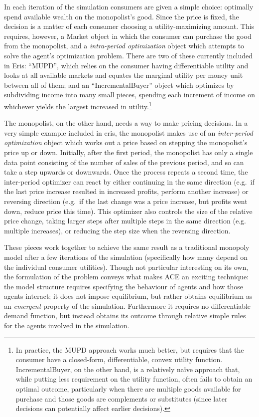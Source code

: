 \documentclass[12pt]{article}
\numberwithin{equation}{subsection}
\begin{document}
In each iteration of the simulation consumers are given a simple choice: optimally spend available
wealth on the monopolist's good.  Since the
price is fixed, the decision is a matter of each consumer choosing a utility-maximizing amount.
This requires, however, a Market object in which the consumer can purchase the good from the
monopolist, and a \emph{intra-period optimization} object which attempts to solve the agent's
optimization problem.  There are two of these currently included in Eris: ``MUPD'', which relies on
the consumer having differentiable utility and looks at all available markets and equates the
marginal utility per money unit between all of them; and an ``IncrementalBuyer'' object which
optimizes by subdividing income into many small pieces, spending each increment of income on
whichever yields the largest increased in utility.\footnote{In practice, the MUPD approach works
    much better, but requires that the consumer have a closed-form, differentiable, convex utility
    function.  IncrementalBuyer, on the other hand, is a relatively naïve approach that, while
    putting less requirement on the utility function, often fails to obtain an optimal outcome,
    particularly when there are multiple goods available for purchase and those goods are
    complements or substitutes (since later decisions can potentially affect earlier decisions).
}

The monopolist, on the other hand, needs a way to make pricing decisions.  In a very simple example
included in eris, the monopolist makes use of an \emph{inter-period optimization} object which works
out a price based on stepping the monopolist's price up or down.  Initially, after the first period,
the monopolist has only a single data point consisting of the number of sales of the previous
period, and so can take a step upwards or downwards.  Once the process repeats a second time, the
inter-period optimizer can react by either continuing in the same direction (e.g.\ if the last
price increase resulted in increased profits, perform another increase) or reversing direction
(e.g.\ if the last change was a price increase, but profits went down, reduce price this time).
This optimizer also controls the size of the relative price change, taking larger steps after
multiple steps in the same direction (e.g. multiple increases), or reducing the step size when the
reversing direction.

These pieces work together to achieve the same result as a traditional monopoly model after a few
iterations of the simulation (specifically how many depend on the individual consumer utilities).
Though not particular interesting on its own, the formulation of the problem conveys what makes ACE
an exciting technique: the model structure requires specifying the behaviour of agents and how those
agents interact; it does not impose equilibrium, but rather obtains equilibrium as an
\emph{emergent} property of the simulation.  Furthermore it requires no differentiable demand
function, but instead obtains its outcome through relative simple rules for the agents involved in
the simulation.
\end{document}
